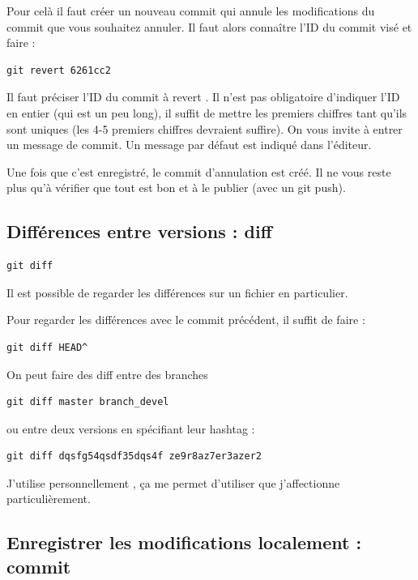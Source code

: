 \documentclass[a4paper,twoside]{article}
\begin{document}
Pour celà il faut créer un nouveau commit qui annule les modifications du commit que vous souhaitez annuler. Il faut alors connaître l'ID du commit visé et faire : 
\begin{verbatim}
git revert 6261cc2
\end{verbatim}
Il faut préciser l'ID du commit à \og revert \fg. Il n'est pas obligatoire d'indiquer l'ID en entier (qui est un peu long), il suffit de mettre les premiers chiffres tant qu'ils sont uniques (les 4-5 premiers chiffres devraient suffire). On vous invite à entrer un message de commit. Un message par défaut est indiqué dans l'éditeur.

Une fois que c'est enregistré, le commit d'annulation est créé. Il ne vous reste plus qu'à vérifier que tout est bon et à le publier (avec un git push).

\subsection{Différences entre versions : diff}

\begin{verbatim}
git diff
\end{verbatim}

\begin{remarque}
Il est possible de regarder les différences sur un fichier en particulier.
\end{remarque}

Pour regarder les différences avec le commit précédent, il suffit de faire :
\begin{verbatim}
git diff HEAD^
\end{verbatim}

\bigskip

On peut faire des diff entre des branches 
\begin{verbatim}
git diff master branch_devel
\end{verbatim}
ou entre deux versions en spécifiant leur hashtag : 
\begin{verbatim}
git diff dqsfg54qsdf35dqs4f ze9r8az7er3azer2
\end{verbatim}

J'utilise personnellement , ça me permet d'utiliser  que j'affectionne particulièrement.

\subsection{Enregistrer les modifications localement : commit}\label{sec:commit}
\end{document}
